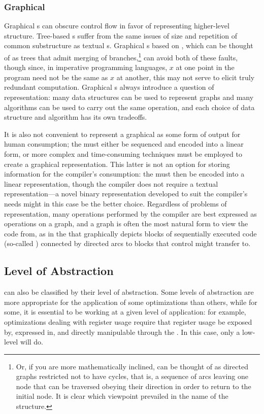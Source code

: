 \subsubsection{Graphical}
Graphical s can obscure control flow in favor of representing higher-level structure. Tree-based s suffer from the same issues of size and repetition of common substructure as textual s. Graphical s based on , which can be thought of as trees that admit merging of branches,\footnote{Or, if you are more mathematically inclined, can be thought of as directed graphs restricted not to have cycles, that is, a sequence of arcs leaving one node that can be traversed obeying their direction in order to return to the initial node. It is clear which viewpoint prevailed in the name of the structure.} can avoid both of these faults, though since, in imperative programming languages, $x$ at one point in the program need not be the same as $x$ at another, this may not serve to elicit truly redundant computation. Graphical s always introduce a question of representation: many data structures can be used to represent graphs and many algorithms can be used to carry out the same operation, and each choice of data structure and algorithm has its own tradeoffs.

It is also not convenient to represent a graphical  as some form of output for human consumption; the  must either be sequenced and encoded into a linear form, or more complex and time-consuming techniques must be employed to create a graphical representation. This latter is not an option for storing information for the compiler's consumption: the  must then be encoded into a linear representation, though the compiler does not require a textual representation---a novel binary representation developed to suit the compiler's needs might in this case be the better choice. Regardless of problems of representation, many operations performed by the compiler are best expressed as operations on a graph, and a graph is often the most natural form to view the code from, as in the  that graphically depicts blocks of sequentially executed code (so-called ) connected by directed arcs to blocks that control might transfer to.

\subsection{Level of Abstraction}
\IRs can also be classified by their level of abstraction. Some levels of abstraction are more appropriate for the application of some optimizations than others, while for some, it is essential to be working at a given level of application: for example, optimizations dealing with register usage require that register usage be exposed by, expressed in, and directly manipulable through the \IR{}. In this case, only a low-level \IR will do.

